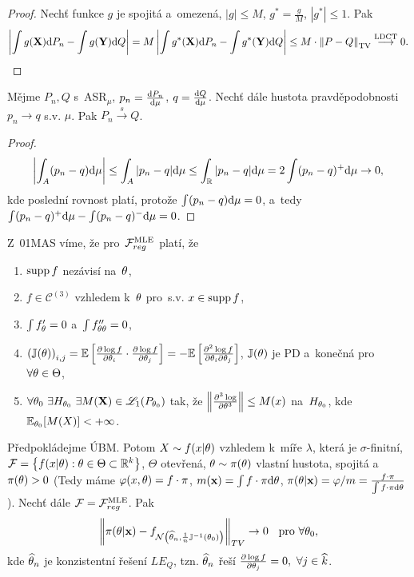 \begin{proof}
	Nechť funkce $g$ je spojitá a~omezená, $|g|\leq M$, $g^\ast =\frac{g}{M}$, $|g^\ast|\leq 1$. Pak
	$$ \left| \int g(\textbf{X})\mathrm{d} P_n-\int g(\textbf{Y})\mathrm{d} Q \right|=M\left| \int g^\ast(\textbf{X})\mathrm{d} P_n-\int g^\ast(\textbf{Y})\mathrm{d} Q \right|\leq M\cdot \left\| P-Q\right\|_{\mathrm{TV}} \stackrel{\text{LDCT}}{\longrightarrow} 0.$$
\end{proof}
\begin{theorem}
	Mějme $P_n,Q$ s~ASR$_\mu$, $p_n=\frac{\mathrm{d} P_n}{\mathrm{d} \mu}$, $q=\frac{\mathrm{d} Q}{\mathrm{d} \mu}$. Nechť dále hustota pravděpodobnosti $p_n\to q$ s.v. $\mu$. Pak $P_n\stackrel{s}{\longrightarrow}Q$. 
	\begin{proof}
		$$ \left| \int_A (p_n-q)\mathrm{d}\mu \right|\leq \int_A|p_n-q|\mathrm{d}\mu\leq \int_{\mathbb{R}}|p_n-q|\mathrm{d}\mu=2\int(p_n-q)^+\mathrm{d}\mu\to0,$$
		kde poslední rovnost platí, protože $\int(p_n-q)\mathrm{d}\mu=0$, a~tedy $\int(p_n-q)^+\mathrm{d}\mu-\int(p_n-q)^-\mathrm{d}\mu=0$.	\end{proof}
\end{theorem}
\begin{remark} Z~01MAS víme, že pro~$\mathcal{F}_{reg}^{\mathrm{{\footnotesize MLE }}}$ platí, že \begin{enumerate}[1)]
		\item $\mathop{\mathrm{supp}} f$ nezávisí na~$\theta$,
		\item $f\in\mathcal{C}^{(3)}$ vzhledem k~$\theta$ pro~s.v. $x\in\mathop{\mathrm{supp}} f$,
		\item $\int f_\theta'=0$ a~$\int f_{\theta\theta}''=0$,
		\item $\left( \mathbb{J}(\theta) \right)_{i,j}=\mathbb{E}\left[ \frac{\partial\log f}{\partial \theta_i}\cdot\frac{\partial\log f}{\partial \theta_j} \right]=-\mathbb{E}\left[ \frac{\partial^2 \log f}{\partial\theta_i \partial \theta_j} \right]$, $\mathbb{J}(\theta)$ je PD a~konečná pro~$\forall\theta\in\Theta$,
		\item $\forall\theta_0~\exists H_{\theta_0}~\exists M(\textbf{X})\in\mathscr{L}_1(P_{\theta_0})$ tak, že $\left\| \frac{\partial^3\log }{\partial \theta^3}\right\|\leq M(x)$ na~$H_{\theta_0}$, kde $\mathbb{E}_{\theta_0}[M(X)]<+\infty$.
	\end{enumerate}
\end{remark}
\begin{theorem}
	Předpokládejme ÚBM. Potom $X\sim f(x|\theta)$ vzhledem k~míře $\lambda$, která je $\sigma$-finitní, $\mathcal{F}=\left\{ f(x|\theta):\theta\in\Theta\subset \mathbb{R}^k \right\}$, $\Theta$ otevřená, $\theta\sim\pi(\theta)$ vlastní hustota, spojitá a~$\pi(\theta)>0$ (Tedy máme $\varphi(x,\theta)=f\cdot\pi$, $m(\textbf{x})=\int f\cdot \pi\mathrm{d}\theta$, $\pi(\theta|\textbf{x})=\varphi/m=\frac{f\cdot\pi}{\int f\cdot\pi\mathrm{d}\theta}$). Nechť dále $\mathcal{F}=\mathcal{F}_{reg}^{\mathrm{{\footnotesize MLE }}}$. Pak
	$$ \left\| \pi(\theta|\textbf{x})-f_{\mathcal{N}\left( \widehat{\theta}_n,\frac{1}{n}\mathbb{J}^{-1}(\theta_0) \right)} \right\|_{TV}\to0 \hspace{0.2cm}\text{ pro~}\forall \theta_0,$$
	kde $\widehat{\theta}_n$ je konzistentní řešení $LE_Q$, tzn. $\widehat{\theta}_n$ řeší $\frac{\partial \log f}{\partial \theta_j}=0,~\forall j\in\widehat{k}$.
\end{theorem}
